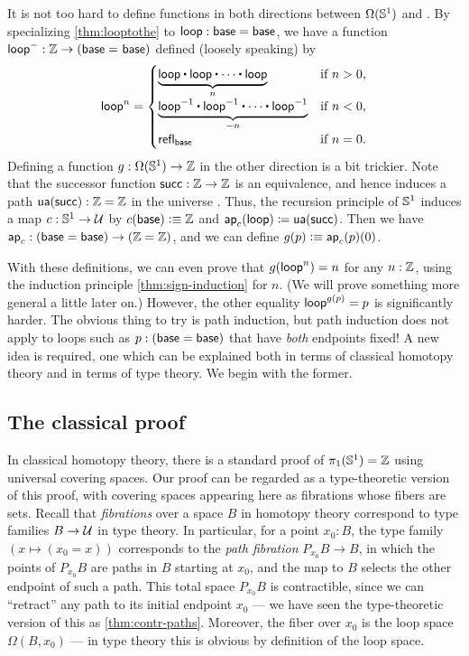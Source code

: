It is not too hard to define functions in both directions between $\Omega(\mathbb{S}^1)$ and \Z.
By specializing \autoref{thm:looptothe} to $\mathsf{loop}:\mathsf{base}=\mathsf{base}$, we have a function $\mathsf{loop}^- : \mathbb{Z} \rightarrow (\mathsf{base} =_{} \mathsf{base})$ defined (loosely speaking) by
\[
  \lloop^n =
  \begin{cases}
    \underbrace{\lloop \ct \lloop \ct \cdots \ct \lloop}_{n}  & \text{if $n > 0$,} \\
    \underbrace{\opp \lloop \ct \opp \lloop \ct \cdots \ct \opp \lloop}_{-n} & \text{if $n < 0$,} \\
    \refl{\base} & \text{if $n = 0$.}
\end{cases}
\]
%
Defining a function $g:\Omega(\mathbb{S}^1)\to\mathbb{Z}$ in the other direction is a bit trickier.
Note that the successor function $\mathsf{succ}:\mathbb{Z}\to\mathbb{Z}$ is an equivalence,
%
and hence induces a path $\mathsf{ua}(\mathsf{succ}):\mathbb{Z}=\mathbb{Z}$ in the universe \type.
Thus, the recursion principle of $\mathbb{S}^1$ induces a map $c:\mathbb{S}^1\to\mathcal{U}$ by $c(\mathsf{base})\vcentcolon\equiv \mathbb{Z}$ and $\mathsf{ap}_{c} (\mathsf{loop}) \coloneqq \mathsf{ua}(\mathsf{succ})$.
Then we have $\mathsf{ap}_{c} : (\mathsf{base}=\mathsf{base}) \to (\mathbb{Z}=\mathbb{Z})$, and we can define $g(p)\vcentcolon\equiv \mathsf{ap}_{c}(p)(0)$.

With these definitions, we can even prove that $g(\mathsf{loop}^n)=n$ for any $n:\mathbb{Z}$, using the induction principle \autoref{thm:sign-induction} for $n$.
(We will prove something more general a little later on.)
However, the other equality $\mathsf{loop}^{g(p)}=p$ is significantly harder.
The obvious thing to try is path induction, but path induction does not apply to loops such as $p:(\mathsf{base}=\mathsf{base})$ that have \emph{both} endpoints fixed!
A new idea is required, one which can be explained both in terms of classical homotopy theory and in terms of type theory.
We begin with the former.


\subsection{The classical proof}
\label{sec:pi1s1-classical-proof}

%
In classical homotopy theory, there is a standard proof of $\pi_1(\mathbb{S}^1)=\mathbb{Z}$ using universal covering spaces.
Our proof can be regarded as a type-theoretic version of this proof, with covering spaces appearing here as fibrations whose fibers are sets.
%
%
Recall that \emph{fibrations} over a space $B$ in homotopy theory correspond to type families $B\to\mathcal{U}$ in type theory.
%
%
In particular, for a point $x_0:B$, the type family $(x\mapsto (x_0=x))$ corresponds to the \emph{path fibration} $P_{x_0} B \to B$, in which the points of $P_{x_0} B$ are paths in $B$ starting at $x_0$, and the map to $B$ selects the other endpoint of such a path.
This total space $P_{x_0} B$ is contractible, since we can ``retract'' any path to its initial endpoint $x_0$ --- we have seen the type-theoretic version of this as \autoref{thm:contr-paths}.
Moreover, the fiber over $x_0$ is the loop space $\Omega(B,x_0)$ --- in type theory this is obvious by definition of the loop space.

